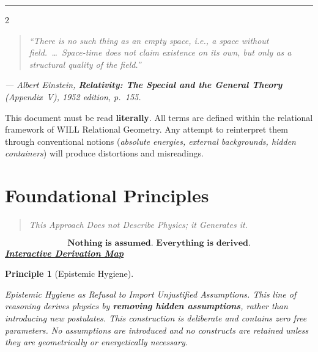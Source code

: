 \documentclass[10pt, a4paper]{article}
\newtheorem{principle}[theorem]{Principle}
\begin{document}
\vspace{12pt}
\hrule
\vspace{8pt}

\begin{multicols}{2}


\begin{quote}
\textit{``There is no such thing as an empty space, i.e., a space without field.\ \ldots\ Space-time does not claim existence on its own, but only as a structural quality of the field.''}
\end{quote}
\noindent\textit{--- Albert Einstein, \textbf{Relativity: The Special and the General Theory} (Appendix~V), 1952 edition, p.~155.}

\begin{tcolorbox}[colback=gray!5, colframe=black!80!black, title=Reading Protocol]
This document must be read \textbf{literally}. All terms are defined within the relational framework of WILL Relational Geometry. Any attempt to reinterpret them through conventional notions (\emph{absolute energies, external backgrounds, hidden containers}) will produce distortions and misreadings.
\end{tcolorbox}

\section{Foundational Principles}
\begin{quote}
  \textit{This Approach Does not Describe Physics; it Generates it.}
\end{quote}

\begin{tcolorbox}[colback=gray!5, colframe=black!80!black, title=Guiding Principle:]
\[
\boxed{\textbf{Nothing is assumed. Everything is derived.}}
\]
\textbf{\textit{\href{https://willrg.com/LOGOS_MAP/}{Interactive Derivation Map}}}
\end{tcolorbox}

\begin{principle}[Epistemic Hygiene]
\hypertarget{pr:epistemic}{}\label{pr:epistemic}
\emph{Epistemic Hygiene as Refusal to Import Unjustified Assumptions.} This line of reasoning derives physics by \textbf{removing hidden assumptions}, rather than introducing new postulates. This construction is deliberate and contains zero free parameters. No assumptions are introduced and no constructs are retained unless they are geometrically or energetically necessary.
\end{principle}


\end{multicols}
\end{document}
